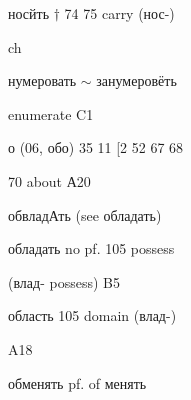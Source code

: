 \begin{minipage}[t]{0.475\textwidth}
\noindent носйть $\dagger$ 74 75 carry (нос-)\par
\noindent ch\par
\noindent нумеровать $\sim$ занумеровёть\par
\noindent enumerate C1\par
\noindent о (06, обо) 35 11 [2 52 67 68\par
{} 70 about А20\par
\noindent обвладАть (see обладать)\par
\noindent обладать no pf. 105 possess\par
\noindent (влад- possess) B5\par
\noindent область 105 domain (влад-)\par
\noindent A18\par
\noindent обменять pf. of менять\par
\end{minipage}\hfill
